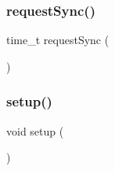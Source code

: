 \subsubsection{\texorpdfstring{request\+Sync()}{requestSync()}}
{\footnotesize\ttfamily time\+\_\+t request\+Sync (\begin{DoxyParamCaption}{ }\end{DoxyParamCaption})}

\mbox{\label{_time_serial_date_strings_8ino_a4fc01d736fe50cf5b977f755b675f11d}} 
\subsubsection{\texorpdfstring{setup()}{setup()}}
{\footnotesize\ttfamily void setup (\begin{DoxyParamCaption}{ }\end{DoxyParamCaption})}

